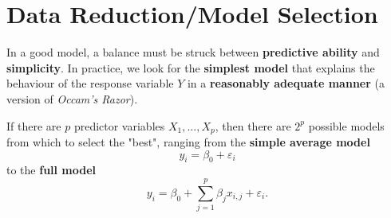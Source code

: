 
\section{Data Reduction/Model Selection} \label{sec:Data.Red}
In a good model, a balance must  be struck between \textbf{predictive ability} and \textbf{simplicity}. In practice, we look for the \textbf{simplest model} that explains the behaviour of the response variable $Y$ in a \textbf{reasonably adequate manner} (a version of \textit{Occam's Razor}). \par If there are $p$ predictor variables $X_1,\ldots,X_p$, then there are $2^{p}$ possible models from which to select the "best", ranging from the \textbf{simple average model} $${y}_{i}=\beta_{0}+\varepsilon_{i}$$ to the \textbf{full model} $${y}_{i}=\beta_{0}+\sum_{j=1}^{p}\beta_{j}x_{i,j}+\varepsilon_{i}.$$

